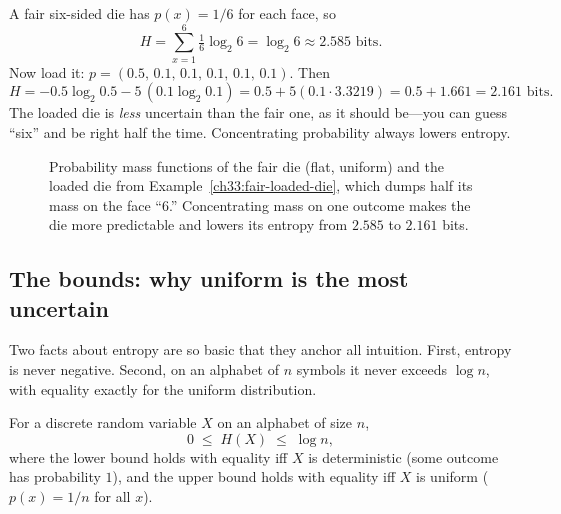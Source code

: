 \begin{example}
\label{ch33:fair-loaded-die}
A fair six-sided die has $p(x) = 1/6$ for each face, so
\[
  H = \sum_{x=1}^{6} \tfrac16 \log_2 6 = \log_2 6 \approx 2.585 \text{ bits}.
\]
Now load it: $p = (0.5,\,0.1,\,0.1,\,0.1,\,0.1,\,0.1)$. Then
\[
  H = -0.5\log_2 0.5 - 5\,(0.1\log_2 0.1)
    = 0.5 + 5(0.1 \cdot 3.3219)
    = 0.5 + 1.661 = 2.161 \text{ bits}.
\]
The loaded die is \emph{less} uncertain than the fair one, as it should be---you can guess ``six'' and be
right half the time. Concentrating probability always lowers entropy.
\end{example}

\begin{figure}[H]
\centering
{}
\caption{Probability mass functions of the fair die (flat, uniform) and the loaded die from
Example~\ref{ch33:fair-loaded-die}, which dumps half its mass on the face ``$6$.'' Concentrating mass on
one outcome makes the die more predictable and lowers its entropy from $2.585$ to $2.161$ bits.}
\label{ch33:fig-die-pmf}
\end{figure}

\subsection{The bounds: why uniform is the most uncertain}

Two facts about entropy are so basic that they anchor all intuition. First, entropy is never negative.
Second, on an alphabet of $n$ symbols it never exceeds $\log n$, with equality exactly for the uniform
distribution.

\begin{theorem}
\label{ch33:entropy-bounds}
For a discrete random variable $X$ on an alphabet of size $n$,
\[
  0 \;\le\; H(X) \;\le\; \log n,
\]
where the lower bound holds with equality iff $X$ is deterministic (some outcome has probability $1$), and
the upper bound holds with equality iff $X$ is uniform ($p(x) = 1/n$ for all $x$).
\end{theorem}

